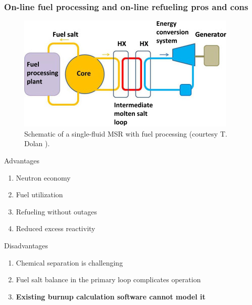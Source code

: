 \begin{frame}
\frametitle{On-line fuel processing and on-line refueling pros and 
cons}
\vspace{-2mm}
\begin{figure}[t]
	\includegraphics[height=0.2\textwidth]{./images/dolan.jpg}
		\vspace{-2mm}
	\caption{Schematic of a single-fluid MSR with fuel processing 
	(courtesy T. Dolan \cite{dolan_1_2017}).} 
\end{figure}  
	\vspace{-3mm}
\begin{block}{Advantages}
	\begin{enumerate}
		\item Neutron economy
		\item Fuel utilization
		\item Refueling without outages
		\item Reduced excess reactivity
	\end{enumerate}
\end{block}

\begin{block}{Disadvantages}
	\begin{enumerate}
		\item Chemical separation is challenging
		\item Fuel salt balance in the primary loop complicates operation
		\item \textbf{Existing burnup calculation software cannot model it}
	\end{enumerate}
\end{block}

\end{frame}


